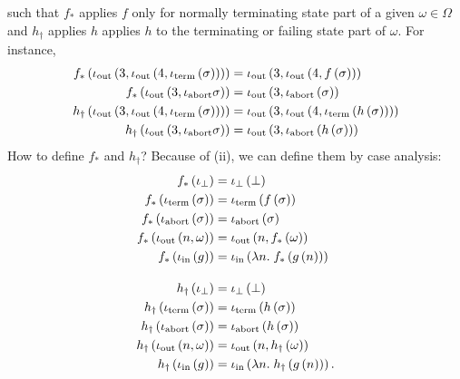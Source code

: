 \begin{enumcirc}
\begin{enumrm}
		such that $f_*$ applies $f$ only for normally terminating state part of a given
		$\omega \in \Omega$ and $h_\dagger$ applies $h$ applies $h$ to the terminating
		or failing state part of $\omega$.
		For instance,
		\begin{align*}
			f_*\left( \iota_{\textrm{out}}\left( 3, \iota_{\textrm{out}}\left( 4, \iota_{\textrm{term}}\left( \sigma \right) \right) \right) \right)       & = \iota_{\textrm{out}}\left( 3, \iota_{\textrm{out}}\left( 4, f\left( \sigma \right) \right) \right)               \\
			f_*\left( \iota_{\textrm{out}}\left( 3, \iota_{\textrm{abort}}{\sigma} \right) \right)                            & = \iota_{\textrm{out}}\left( 3, \iota_{\textrm{abort}}\left( \sigma \right) \right)                         \\
			h_\dagger\left( \iota_{\textrm{out}}\left( 3, \iota_{\textrm{out}}\left( 4, \iota_{\textrm{term}}\left( \sigma \right) \right) \right) \right) & = \iota_{\textrm{out}}\left( 3, \iota_{\textrm{out}}\left( 4, \iota_{\textrm{term}}\left( h\left( \sigma \right) \right) \right) \right) \\
			h_\dagger\left( \iota_{\textrm{out}}\left( 3, \iota_{\textrm{abort}}{\sigma} \right) \right)                      & = \iota_{\textrm{out}}\left( 3, \iota_{\textrm{abort}}\left( h\left( \sigma \right) \right) \right)
		\end{align*}
		How to define $f_*$ and $h_\dagger$?
		Because of (ii), we can define them by case analysis:
		\begin{align*}
			f_*\prths{\ibot}                         =\; & \ibot\prths{\bot}                                     \\
			f_*\prths{\iterm\prths{\sigma}}          =\; & \iterm\prths{f\prths{\sigma}}                         \\
			f_*\prths{\iabort\prths{\sigma}}         =\; & \iabort\prths{\sigma}                                 \\
			f_*\prths{\iout\prths{n, \omega}}        =\; & \iout\prths{n, f_*\prths{\omega}}                     \\
			f_*\prths{\iin\prths{g}}                 =\; & \iin\prths{\lambda n.\; f_*\prths{g\prths{n}}}        \\[1em]
			h_\dagger\prths{\ibot}                   =\; & \ibot\prths{\bot}                                     \\
			h_\dagger\prths{\iterm\prths{\sigma}}    =\; & \iterm\prths{h\prths{\sigma}}                         \\
			h_\dagger\prths{\iabort\prths{\sigma}}   =\; & \iabort\prths{h\prths{\sigma}}                        \\
			h_\dagger\prths{\iout\prths{n, \omega}}  =\; & \iout\prths{n, h_\dagger\prths{\omega}}               \\
			h_\dagger\prths{\iin\prths{g}}           =\; & \iin\prths{\lambda n.\; h_\dagger\prths{g\prths{n}}}.

\end{align*}
\end{enumrm}
\end{enumcirc}
